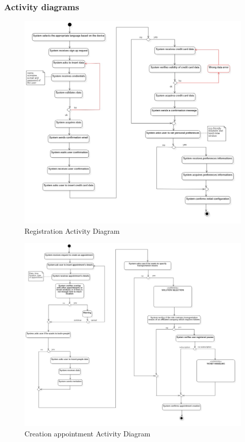 	\subsubsection{Activity diagrams}
		\begin{figure}[H]
			\centerline{\includegraphics[width=\paperwidth~]{Images/RegistrationDiagramAD}}
			\caption{Registration Activity Diagram}
		\end{figure}
		\begin{figure}[H]
			\centerline{\includegraphics[width=\paperwidth~]{Images/CreationAppointmentAD}}
			\caption{Creation appointment Activity Diagram}
		\end{figure}
